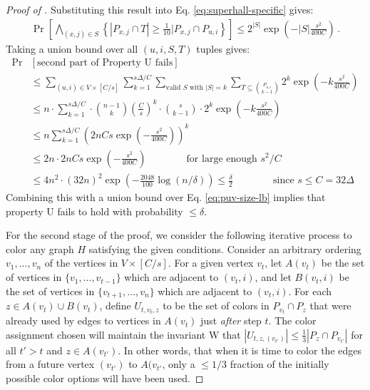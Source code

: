 \documentclass[10pt]{article}
\theoremstyle{definition}\newtheorem{definition}[lemma]{Definition}
\theoremstyle{remark}  \newtheorem*{remark}{Remark}
\begin{document}
\begin{proof}[Proof of ]
  Substituting this result into Eq. \ref{eq:superhall-specific} gives:
  \begin{align*}
    \Pr\left[ \bigwedge_{(x,j) \in S} \left\{ |P_{x,j} \cap T| \ge \frac{1}{10} |P_{x,j} \cap P_{u,i}\right\} \right] \le 2^{|S|} \exp\left( - |S| \frac{s^2}{400C} \right) \,.
  \end{align*}
  Taking a union bound over all $(u,i,S,T)$ tuples gives:
  \begin{align*}
    \Pr&[\text{second part of Property U fails}] \\
      &\le \sum_{(u,i) \in V \times [C/s]} \sum_{k=1}^{s \Delta / C} \sum_{\text{valid $S$ with $|S| = k$}} \sum_{T \subseteq \binom{P_{u,i}}{k-1}} 2^{k} \exp\left( - k \frac{s^2}{400C}\right) \\
      &\le n \cdot \sum_{k=1}^{s \Delta / C} \cdot \binom{n - 1}{k} \left(\frac{C}{s}\right)^k \cdot \binom{s}{k - 1} \cdot 2^{k} \exp\left( - k \frac{s^2}{400C}\right) \\
      &\le n \sum_{k=1}^{s \Delta / C} \left( 2 n C s \exp\left(- \frac{s^2}{400 C}\right) \right)^k \\
      &\le 2 n \cdot 2 n C s \exp\left(- \frac{s^2}{400 C}\right) \qquad\qquad \text{for large enough $s^2/C$} \\
      & \le 4 n^2 \cdot (32 n)^2 \exp(- \frac{2048}{100} \log(n/\delta)) \le \frac{\delta}{2} \qquad\qquad \text{since $s \le C = 32 \Delta$}
  \end{align*}
  Combining this with a union bound over Eq. \ref{eq:puv-size-lb} implies that property U fails to hold with probability $\le \delta$.
  
  For the second stage of the proof, we consider the following iterative process to color any graph $H$ satisfying the given conditions. Consider an arbitrary ordering $v_1,\ldots,v_n$ of the vertices in $V \times [C/s]$. For a given vertex $v_t$, let $A(v_t)$ be the set of vertices in $\{v_1,\ldots,v_{t-1}\}$ which are adjacent to $(v_t,i)$, and let $B(v_t,i)$ be the set of vertices in 
  $\{v_{t+1},\ldots,v_{n}\}$ which are adjacent to $(v_t,i)$. For each $z \in A(v_t) \cup B(v_t)$, define $U_{t,v_t,z}$ to be the set of colors in $P_{v_t} \cap P_z$ that were already used by edges to vertices in $A(v_t)$ just \emph{after} step $t$. The color assignment chosen will maintain the invariant W that $|U_{t,z,(v_{t'})}| \le \frac{1}{3} |P_z \cap P_{v_{t'}}|$ for all $t' > t$ and $z \in A(v_{t'})$. In other words, that when it is time to color the edges from a future vertex $(v_{t'})$ to $A(v_{t'}$, only a $\le 1/3$ fraction of the initially possible color options will have been used.
  

\end{proof}
\end{document}
